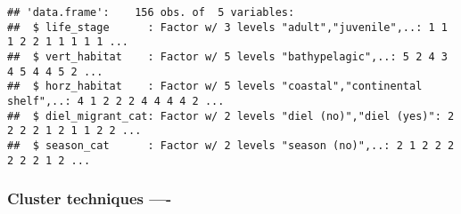 \documentclass[
]{article}
\newenvironment{Shaded}{\begin{snugshade}}{\end{snugshade}}
\newcommand{\CommentTok}[1]{\textcolor[rgb]{0.56,0.35,0.01}{\textit{#1}}}
\newcommand{\DecValTok}[1]{\textcolor[rgb]{0.00,0.00,0.81}{#1}}
\newcommand{\DocumentationTok}[1]{\textcolor[rgb]{0.56,0.35,0.01}{\textbf{\textit{#1}}}}
\newcommand{\FunctionTok}[1]{\textcolor[rgb]{0.00,0.00,0.00}{#1}}
\newcommand{\NormalTok}[1]{#1}
\newcommand{\OtherTok}[1]{\textcolor[rgb]{0.56,0.35,0.01}{#1}}
\newcommand{\SpecialCharTok}[1]{\textcolor[rgb]{0.00,0.00,0.00}{#1}}
\begin{document}
\begin{Shaded}
\end{Shaded}

\begin{verbatim}
## 'data.frame':    156 obs. of  5 variables:
##  $ life_stage      : Factor w/ 3 levels "adult","juvenile",..: 1 1 1 2 2 1 1 1 1 1 ...
##  $ vert_habitat    : Factor w/ 5 levels "bathypelagic",..: 5 2 4 3 4 5 4 4 5 2 ...
##  $ horz_habitat    : Factor w/ 5 levels "coastal","continental shelf",..: 4 1 2 2 2 4 4 4 4 2 ...
##  $ diel_migrant_cat: Factor w/ 2 levels "diel (no)","diel (yes)": 2 2 2 2 1 2 1 1 2 2 ...
##  $ season_cat      : Factor w/ 2 levels "season (no)",..: 2 1 2 2 2 2 2 2 1 2 ...
\end{verbatim}

\hypertarget{cluster-techniques--}{%
\subsubsection{Cluster techniques ----}\label{cluster-techniques--}}
\end{document}
